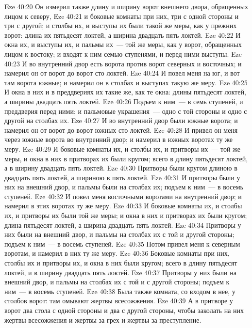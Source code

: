 \vs Eze 40:20 Он измерил также длину и ширину ворот внешнего двора, обращенных лицом к северу,
\vs Eze 40:21 и боковые комнаты при них, три с одной стороны и три с другой; и столбы их, и выступы их были такой же меры, как у прежних ворот: длина их пятьдесят локтей, а ширина двадцать пять локтей.
\vs Eze 40:22 И окна их, и выступы их, и пальмы их~--- той же меры, как у ворот, обращенных лицом к востоку; и входят к ним семью ступенями, и перед ними выступы.
\vs Eze 40:23 И во внутренний двор есть ворота против ворот северных и восточных; и намерил он от ворот до ворот сто локтей.
\vs Eze 40:24 И повел меня на юг, и вот там ворота южные; и намерил он в столбах и выступах такую же меру.
\vs Eze 40:25 И окна в них и в преддвериях их такие же, как те окна: длины пятьдесят локтей, а ширины двадцать пять локтей.
\vs Eze 40:26 Подъем к ним~--- в семь ступеней, и преддверия перед ними; и пальмовые украшения~--- одно с той стороны и одно с другой на столбах их.
\vs Eze 40:27 И во внутренний двор были южные ворота; и намерил он от ворот до ворот южных сто локтей.
\vs Eze 40:28 И привел он меня через южные ворота во внутренний двор; и намерил в южных воротах ту же меру.
\vs Eze 40:29 И боковые комнаты их, и столбы их, и притворы их~--- той же меры, и окна в них в притворах их были кругом; всего в длину пятьдесят локтей, а в ширину двадцать пять локтей.
\vs Eze 40:30 Притворы были кругом длиною в двадцать пять локтей, а шириною в пять локтей.
\vs Eze 40:31 И притворы были у них на внешний двор, и пальмы были на столбах их; подъем к ним~--- в восемь ступеней.
\vs Eze 40:32 И повел меня восточными воротами на внутренний двор; и намерил в этих воротах ту же меру.
\vs Eze 40:33 И боковые комнаты их, и столбы их, и притворы их были той же меры; и окна в них и притворах их были кругом; длина пятьдесят локтей, а ширина двадцать пять локтей.
\vs Eze 40:34 Притворы у них были на внешний двор, и пальмы на столбах их с той и другой стороны; подъем к ним~--- в восемь ступеней.
\vs Eze 40:35 Потом привел меня к северным воротам, и намерил в них ту же меру.
\vs Eze 40:36 Боковые комнаты при них, столбы их и притворы их, и окна в них были кругом; всего в длину пятьдесят локтей, и в ширину двадцать пять локтей.
\vs Eze 40:37 Притворы у них были на внешний двор, и пальмы на столбах их с той и с другой стороны; подъем к ним~--- в восемь ступеней.
\vs Eze 40:38 Была также комната, со входом в нее, у столбов ворот: там омывают жертвы всесожжения.
\vs Eze 40:39 А в притворе у ворот два стола с одной стороны и два с другой стороны, чтобы заколать на них жертвы всесожжения и жертвы за грех и жертвы за преступление.
